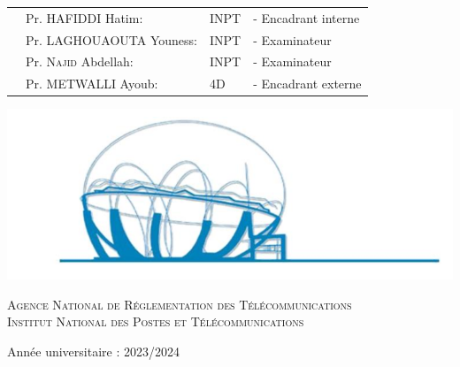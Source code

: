 \begin{center}
\begin{tabular}{p{1cm}lll}
  & \large Pr. HAFIDDI Hatim: & \large INPT & \large - Encadrant interne \\[0.1cm]
  & \large Pr. LAGHOUAOUTA Youness: & \large INPT & \large - Examinateur \\[0.1cm]
  & \large Pr. \textsc{Najid} Abdellah: & \large INPT & \large - Examinateur  \\[0.1cm]
  & \large Pr. \textsc{METWALLI} Ayoub: & \large 4D & \large - Encadrant externe  \\[0.1cm]
  
 
\end{tabular}

\includegraphics[scale=0.45]{Logos/ZLAFA.png}


\textsc{Agence National de Réglementation des Télécommunications}\\
\textsc{Institut National des Postes et Télécommunications}

{\large Année universitaire : 2023/2024}
   
\end{center}


